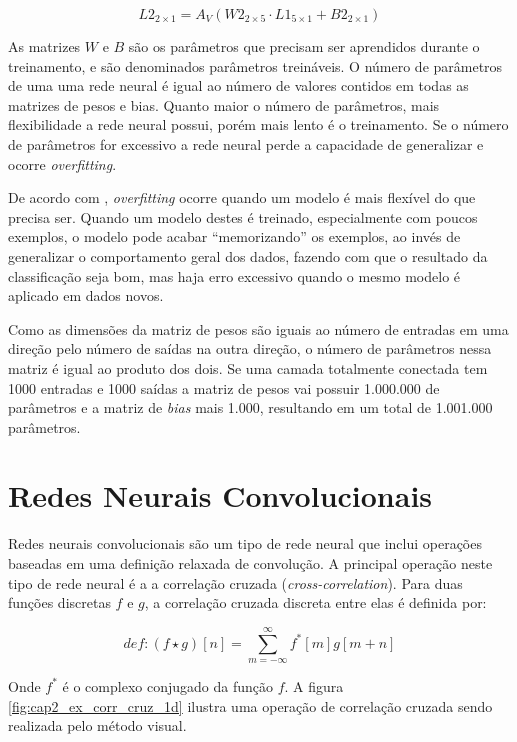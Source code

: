 \begin{equation}
	L2_{2 \times 1}=A_V \left( W2_{2 \times 5} \cdot L1_{5 \times 1}
		+ B2_{2 \times 1} \right)
\end{equation}

As matrizes $W$ e $B$ são os parâmetros que precisam ser aprendidos durante o
treinamento, e são denominados parâmetros treináveis. O número de parâmetros
de uma uma
rede neural é igual ao número de valores contidos em todas as matrizes de pesos
e bias. Quanto maior o número de parâmetros, mais flexibilidade a rede neural
possui, porém mais lento é o treinamento. Se o número de parâmetros for
excessivo a rede neural perde a capacidade de generalizar e ocorre
\emph{overfitting}.

De acordo com \cite{hawkins2004problem}, \emph{overfitting} ocorre quando um
modelo é mais flexível do que precisa ser. Quando um modelo destes é treinado,
especialmente com poucos exemplos, o modelo pode acabar ``memorizando'' os
exemplos, ao invés de generalizar o comportamento geral dos dados, fazendo
com que o resultado da classificação seja bom, mas haja erro excessivo
quando o mesmo modelo é aplicado em dados novos.

Como as dimensões da matriz de pesos são iguais ao número de entradas em uma
direção pelo número de saídas na outra direção, o número de parâmetros nessa
matriz é igual ao produto dos dois. Se uma camada totalmente conectada tem 1000
entradas e 1000 saídas a matriz de pesos vai possuir 1.000.000 de parâmetros
e a matriz de \emph{bias} mais 1.000, resultando em um total de 1.001.000
parâmetros.

\section{Redes Neurais Convolucionais}
Redes neurais convolucionais são um tipo de rede neural que inclui operações
baseadas em uma definição relaxada de convolução. A principal operação
neste tipo de rede neural é a a correlação cruzada (\emph{cross-correlation}).
Para duas funções discretas $f$ e $g$, a correlação cruzada discreta entre
elas é definida por:

\begin{equation}
	def: (f \star g)[n] = \sum_{m=-\infty}^{\infty} f^*[m]g[m+n]
\end{equation}

Onde $f^*$ é o complexo conjugado da função $f$. A figura
\ref{fig:cap2_ex_corr_cruz_1d} ilustra uma operação de correlação cruzada sendo
realizada pelo método visual.

